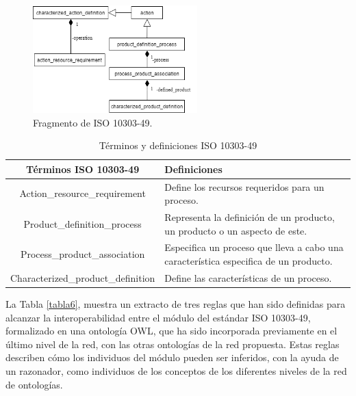 \documentclass[journal]{IEEEtran}
\begin{document}
\begin{figure}[!t]
\centering
\includegraphics[width=2.5in]{figures/figure9.png}
\caption{Fragmento de ISO 10303-49.}
\label{fig9}
\end{figure}

\begin{table}[!t]
\renewcommand{\arraystretch}{1.3}
\caption{T\'erminos y definiciones ISO 10303-49}
\label{tabla5}
\centering
\begin{tabular}{|c|p{4cm}|}
\hline
\bfseries T\'erminos ISO 10303-49 & \bfseries Definiciones \\
\hline
Action\_resource\_requirement & Define los recursos requeridos para un proceso. \\ \cline{1-2}
Product\_definition\_process & Representa la definici\'on de un producto, un producto o un aspecto de este. \\ \cline{1-2}
Process\_product\_association & Especifica un proceso que lleva a cabo una caracter\'istica especifica de un producto. \\  \cline{1-2}
Characterized\_product\_definition & Define las caracter\'isticas de un proceso. \\
\hline
\end{tabular}
\end{table}

La Tabla \ref{tabla6}, muestra un extracto de tres reglas que han sido definidas para alcanzar la interoperabilidad entre el m\'odulo del est\'andar ISO 10303-49, formalizado en una ontolog\'ia OWL, que ha sido incorporada previamente en el \'ultimo nivel de la red, con las otras ontolog\'ias de la red propuesta. Estas reglas describen c\'omo los individuos del m\'odulo pueden ser inferidos, con la ayuda de un razonador, como individuos de los conceptos de los diferentes niveles de la red de ontolog\'ias.
\end{document}

